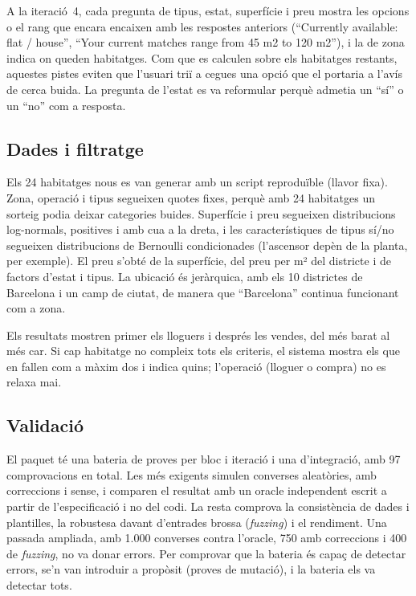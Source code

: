 \documentclass[10pt,a4paper]{article}
\begin{document}
A la iteració~4, cada pregunta de tipus, estat, superfície i preu mostra les opcions o el rang que encara encaixen amb les respostes anteriors (``Currently available: flat / house'', ``Your current matches range from 45 m2 to 120 m2''), i la de zona indica on queden habitatges. Com que es calculen sobre els habitatges restants, aquestes pistes eviten que l'usuari triï a cegues una opció que el portaria a l'avís de cerca buida. La pregunta de l'estat es va reformular perquè admetia un ``sí'' o un ``no'' com a resposta.

\subsection{Dades i filtratge}

Els 24 habitatges nous es van generar amb un script reproduïble (llavor fixa). Zona, operació i tipus segueixen quotes fixes, perquè amb 24 habitatges un sorteig podia deixar categories buides. Superfície i preu segueixen distribucions log-normals, positives i amb cua a la dreta, i les característiques de tipus sí/no segueixen distribucions de Bernoulli condicionades (l'ascensor depèn de la planta, per exemple). El preu s'obté de la superfície, del preu per m² del districte i de factors d'estat i tipus. La ubicació és jeràrquica, amb els 10 districtes de Barcelona i un camp de ciutat, de manera que ``Barcelona'' continua funcionant com a zona.

Els resultats mostren primer els lloguers i després les vendes, del més barat al més car. Si cap habitatge no compleix tots els criteris, el sistema mostra els que en fallen com a màxim dos i indica quins; l'operació (lloguer o compra) no es relaxa mai.

\subsection{Validació}

El paquet té una bateria de proves per bloc i iteració i una d'integració, amb 97 comprovacions en total. Les més exigents simulen converses aleatòries, amb correccions i sense, i comparen el resultat amb un oracle independent escrit a partir de l'especificació i no del codi. La resta comprova la consistència de dades i plantilles, la robustesa davant d'entrades brossa (\emph{fuzzing}) i el rendiment. Una passada ampliada, amb 1.000 converses contra l'oracle, 750 amb correccions i 400 de \emph{fuzzing}, no va donar errors. Per comprovar que la bateria és capaç de detectar errors, se'n van introduir a propòsit (proves de mutació), i la bateria els va detectar tots.
\end{document}
